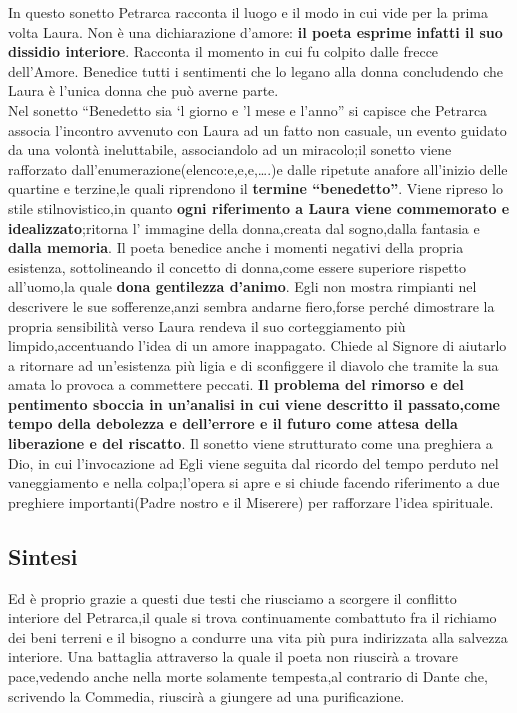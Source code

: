 \documentclass[10pt,a4paper]{article}
\begin{document}
In questo sonetto Petrarca racconta il luogo e il modo in cui vide per la prima volta Laura. Non è una dichiarazione d’amore: \textbf{il poeta esprime infatti il suo dissidio interiore}. Racconta il momento in cui fu colpito dalle frecce dell’Amore. Benedice tutti i sentimenti che lo legano alla donna concludendo che Laura è l’unica donna che può averne parte.\\

Nel sonetto “Benedetto sia ‘l giorno e ’l mese e l’anno” si capisce che Petrarca associa l’incontro avvenuto con Laura ad un fatto non casuale, un evento guidato da una volontà ineluttabile, associandolo ad un miracolo;il sonetto viene rafforzato dall’enumerazione(elenco:e,e,e,….)e dalle ripetute anafore all’inizio delle quartine e terzine,le quali riprendono il \textbf{termine “benedetto”}. Viene ripreso lo stile stilnovistico,in quanto \textbf{ogni riferimento a Laura viene commemorato e idealizzato};ritorna l’ immagine della donna,creata dal sogno,dalla fantasia e \textbf{dalla memoria}. Il poeta benedice anche i momenti negativi della propria esistenza, sottolineando il concetto di donna,come essere superiore rispetto all’uomo,la quale \textbf{dona gentilezza d’animo}. Egli non mostra rimpianti nel descrivere le sue sofferenze,anzi sembra andarne fiero,forse perché dimostrare la propria sensibilità verso Laura rendeva il suo corteggiamento più limpido,accentuando l’idea di un amore inappagato. Chiede al Signore di aiutarlo a ritornare ad un’esistenza più ligia e di sconfiggere il diavolo che tramite la sua amata lo provoca a commettere peccati. \textbf{Il problema del rimorso e del pentimento sboccia in un’analisi in cui viene descritto il passato,come tempo della debolezza e dell’errore e il futuro come attesa della liberazione e del riscatto}. Il sonetto viene strutturato come una preghiera a Dio, in cui l’invocazione ad Egli viene seguita dal ricordo del tempo perduto nel vaneggiamento e nella colpa;l’opera si apre e si chiude facendo riferimento a due preghiere importanti(Padre nostro e il Miserere) per rafforzare l’idea spirituale.\\

\subsection{Sintesi}

Ed è proprio grazie a questi due testi che riusciamo a scorgere il conflitto interiore del Petrarca,il quale si trova continuamente combattuto fra il richiamo dei beni terreni e il bisogno a condurre una vita più pura indirizzata alla salvezza interiore. Una battaglia attraverso la quale il poeta non riuscirà a trovare pace,vedendo anche nella morte solamente tempesta,al contrario di Dante che, scrivendo la Commedia, riuscirà a giungere ad una purificazione.
\end{document}
